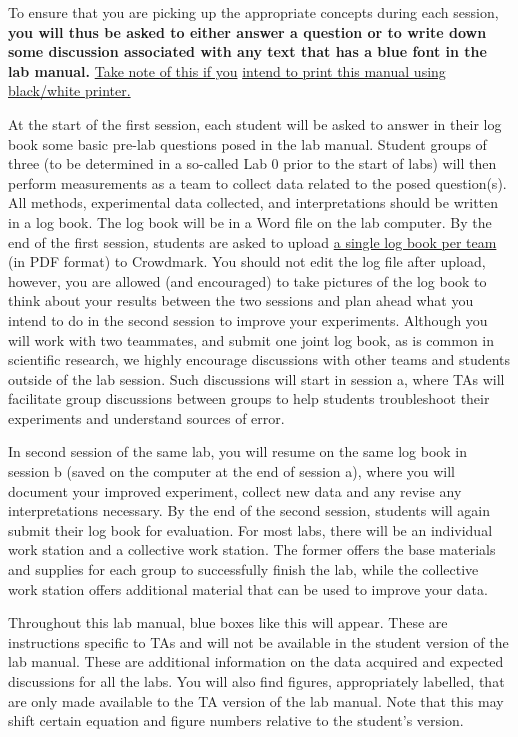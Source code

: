 \documentclass[12pt]{report}
\begin{document}
To ensure that you are picking up the appropriate concepts during each session, 
\textbf{ {\color{blue}  you will thus be asked to either answer a question or to write down some discussion associated with any text that has a blue font in the lab manual.}} \underline{Take note of this if you} \underline{intend to print this manual using black/white printer.}

At the start of the first session, each student will be asked to answer in their log book some basic pre-lab questions posed in the lab manual. Student groups of three (to be determined in a so-called Lab 0 prior to the start of labs) will then perform measurements as a team to collect data related to the posed question(s). 
All methods, experimental data collected, and interpretations should be written in a log book. 
The log book will be in a Word file on the lab computer. By the end of the first session, students are asked to upload \underline{a single log book per team} (in PDF format) to Crowdmark. You should not edit the log file after upload, however, you are allowed (and encouraged) to take pictures of the log book to think about your results between the two sessions and plan ahead what you intend to do in the second session to improve your experiments. 
Although you will work with two teammates, and submit one joint log book, as is common in scientific research, we highly encourage discussions with other teams and students outside of the lab session. Such discussions will start in session a, where TAs will facilitate group discussions between groups to help students troubleshoot their experiments and understand sources of error. 

In second session of the same lab, you will resume on the same log book in session b (saved on the computer at the end of session a), where you will document your improved experiment, collect new data and any revise any interpretations necessary. 
By the end of the second session, students will again submit their log book for evaluation. For most labs, there will be an individual work station and a collective work station. The former offers the base materials and supplies for each group to successfully finish the lab, while the collective work station offers additional material that can be used to improve your data.

\begin{tcolorbox}[title=Comments for TAs]
Throughout this lab manual, blue boxes like this will appear. These are instructions specific to TAs and will not be available in the student version of the lab manual.
These are additional information on the data acquired and expected discussions for all the labs.
You will also find figures, appropriately labelled, that are only made available to the TA version of the lab manual.
Note that this may shift certain equation and figure numbers relative to the student's version.
\end{tcolorbox}
\end{document}
